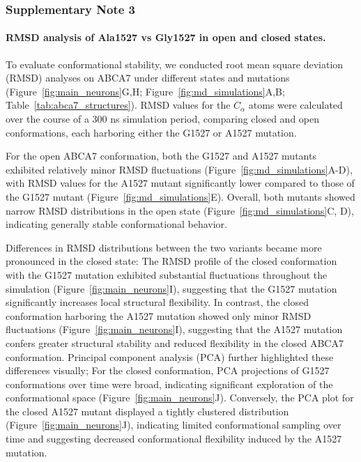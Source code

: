 
\subsubsection*{Supplementary Note 3}
\paragraph{RMSD analysis of Ala1527 vs Gly1527 in open and closed states.}
To evaluate conformational stability, we conducted root mean square deviation (RMSD) analyses on ABCA7 under different states and mutations (Figure~\ref{fig:main_neurons}G,H; Figure~\ref{fig:md_simulations}A,B; Table~\ref{tab:abca7_structures}). RMSD values for the $C_\alpha$ atoms were calculated over the course of a 300 ns simulation period, comparing closed and open conformations, each harboring either the G1527 or A1527 mutation.

For the open ABCA7 conformation, both the G1527 and A1527 mutants exhibited relatively minor RMSD fluctuations (Figure~\ref{fig:md_simulations}A-D), with RMSD values for the A1527 mutant significantly lower compared to those of the G1527 mutant (Figure~\ref{fig:md_simulations}E). Overall, both mutants showed narrow RMSD distributions in the open state (Figure~\ref{fig:md_simulations}C, D), indicating generally stable conformational behavior. 

Differences in RMSD distributions between the two variants became more pronounced in the closed state: The RMSD profile of the closed conformation with the G1527 mutation exhibited substantial fluctuations throughout the simulation (Figure~\ref{fig:main_neurons}I), suggesting that the G1527 mutation significantly increases local structural flexibility. In contrast, the closed conformation harboring the A1527 mutation showed only minor RMSD fluctuations (Figure~\ref{fig:main_neurons}I), suggesting that the A1527 mutation confers greater structural stability and reduced flexibility in the closed ABCA7 conformation. Principal component analysis (PCA) further highlighted these differences visually; For the closed conformation, PCA projections of G1527 conformations over time were broad, indicating significant exploration of the conformational space (Figure~\ref{fig:main_neurons}J). Conversely, the PCA plot for the closed A1527 mutant displayed a tightly clustered distribution (Figure~\ref{fig:main_neurons}J), indicating limited conformational sampling over time and suggesting decreased conformational flexibility induced by the A1527 mutation.

